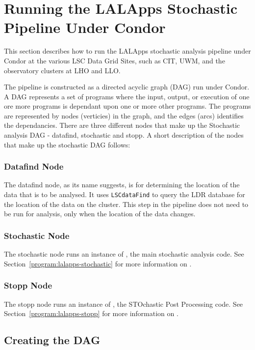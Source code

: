 \section{Running the LALApps Stochastic Pipeline Under Condor}

This section describes how to run the LALApps stochastic analysis
pipeline under Condor at the various LSC Data Grid Sites, such as CIT,
UWM, and the observatory clusters at LHO and LLO.

The pipeline is constructed as a directed acyclic graph (DAG) run under
Condor. A DAG represents a set of programs where the input, output, or
execution of one ore more programs is dependant upon one or more other
programs. The programs are represented by nodes (verticies) in the
graph, and the edges (arcs) identifies the dependancies. There are three
different nodes that make up the Stochastic analysis DAG - datafind,
stochastic and stopp. A short description of the nodes that make up the
stochastic DAG follows:

\subsubsection{Datafind Node}

The datafind node, as its name suggests, is for determining the location
of the data that is to be analysed. It uses \texttt{LSCdataFind} to
query the LDR database for the location of the data on the cluster. This
step in the pipeline does not need to be run for analysis, only when the
location of the data changes.

\subsubsection{Stochastic Node}

The stochastic node runs an instance of , the
main stochastic analysis code. See
Section~\ref{program:lalapps-stochastic} for more information on
.

\subsubsection{Stopp Node}

The stopp node runs an instance of , the STOchastic
Post Processing code. See Section~\ref{program:lalapps-stopp} for more
information on .

\subsection{Creating the DAG}

